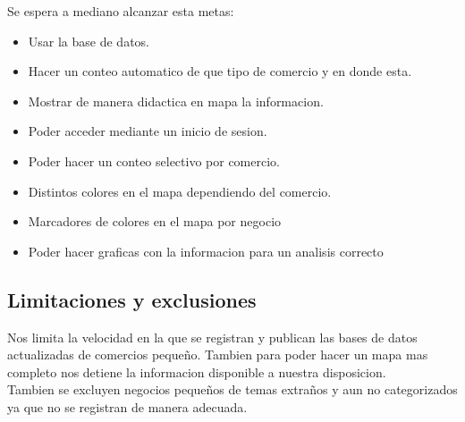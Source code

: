 \documentclass[12pt]{article}
\begin{document}
Se espera a mediano alcanzar esta metas:
\begin{itemize}

        \item Usar la base de datos.       
        \item Hacer un conteo automatico de que tipo de comercio y en donde esta.
        \item Mostrar de manera didactica en mapa la informacion.
        \item Poder acceder mediante un inicio de sesion.
        \item Poder hacer un conteo selectivo por comercio.
        \item Distintos colores en el mapa dependiendo del comercio.
        \item Marcadores de colores en el mapa por negocio
        \item Poder hacer graficas con la informacion para un analisis correcto
        
\end{itemize}


\subsection{Limitaciones y exclusiones}\label{occe}

Nos limita la velocidad en la que se registran y publican las bases de datos actualizadas de comercios pequeño. Tambien para poder hacer un mapa mas completo nos detiene la informacion disponible a nuestra disposicion.\\

Tambien se excluyen negocios pequeños de temas extraños y aun no categorizados ya que no se registran de manera adecuada.
\end{document}
